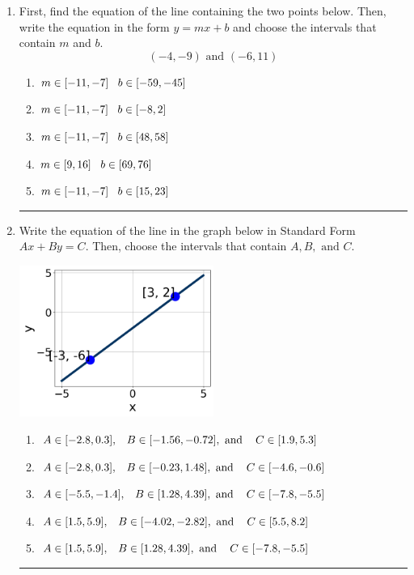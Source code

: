 \documentclass[14pt]{extbook}
\newcommand{\litem}[1]{\item#1\hspace*{-1cm}\rule{\textwidth}{0.4pt}}
\begin{document}
\begin{enumerate}
{\begin{enumerate}[label=\Alph*.]
\end{enumerate} }
\litem{
First, find the equation of the line containing the two points below. Then, write the equation in the form $ y=mx+b $ and choose the intervals that contain $m$ and $b$.\[ (-4, -9) \text{ and } (-6, 11) \]\begin{enumerate}[label=\Alph*.]
\item \( m \in [-11, -7] \hspace*{3mm} b \in [-59, -45] \)
\item \( m \in [-11, -7] \hspace*{3mm} b \in [-8, 2] \)
\item \( m \in [-11, -7] \hspace*{3mm} b \in [48, 58] \)
\item \( m \in [9, 16] \hspace*{3mm} b \in [69, 76] \)
\item \( m \in [-11, -7] \hspace*{3mm} b \in [15, 23] \)

\end{enumerate} }
\litem{
Write the equation of the line in the graph below in Standard Form $Ax+By=C$. Then, choose the intervals that contain $A, B, \text{ and } C$.
\begin{center}
    \includegraphics[width=0.5\textwidth]{../Figures/linearGraphToStandardA.png}
\end{center}
\begin{enumerate}[label=\Alph*.]
\item \( A \in [-2.8, 0.3], \hspace{3mm} B \in [-1.56, -0.72], \text{ and } \hspace{3mm} C \in [1.9, 5.3] \)
\item \( A \in [-2.8, 0.3], \hspace{3mm} B \in [-0.23, 1.48], \text{ and } \hspace{3mm} C \in [-4.6, -0.6] \)
\item \( A \in [-5.5, -1.4], \hspace{3mm} B \in [1.28, 4.39], \text{ and } \hspace{3mm} C \in [-7.8, -5.5] \)
\item \( A \in [1.5, 5.9], \hspace{3mm} B \in [-4.02, -2.82], \text{ and } \hspace{3mm} C \in [5.5, 8.2] \)
\item \( A \in [1.5, 5.9], \hspace{3mm} B \in [1.28, 4.39], \text{ and } \hspace{3mm} C \in [-7.8, -5.5] \)


\end{enumerate}}
\end{enumerate}
\end{document}

